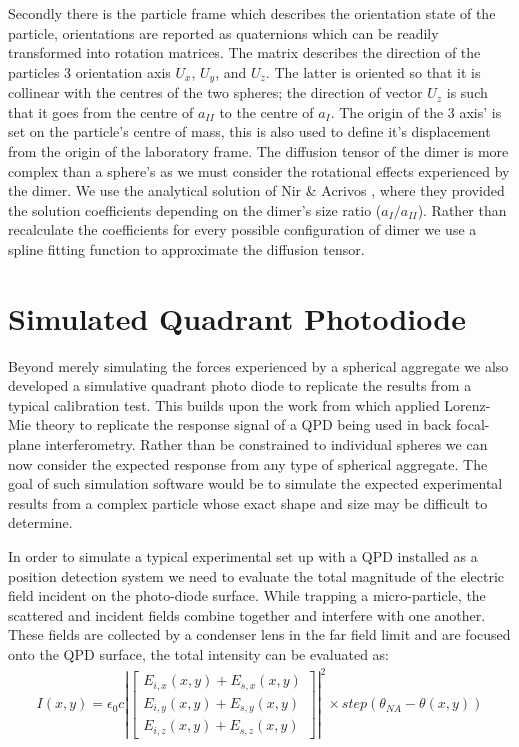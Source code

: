 Secondly there is the particle frame which describes the orientation 
state of the particle, orientations are reported as quaternions which 
can be readily transformed into rotation matrices. The matrix describes 
the direction of the particles 3 orientation axis $U_x$, $U_y$, and 
$U_z$. The latter is oriented so that it is collinear with the centres
of the two spheres; the direction of vector $U_z$ is such that it goes 
from the centre of $a_{II}$ to the centre of $a_{I}$. The origin of the 
3 axis' is set on the particle's centre of mass, this is also used to 
define it's displacement from the origin of the laboratory frame. The 
diffusion tensor of the dimer is more complex than a sphere's as we must consider the rotational effects experienced by the dimer. We use the 
analytical solution of Nir \& Acrivos \cite{Nir1973}, where they provided 
the solution coefficients depending on the dimer's size ratio 
($a_I/a_{II}$). Rather than recalculate the coefficients for every possible configuration of dimer we use a spline fitting function to approximate 
the diffusion tensor. 
\section{Simulated Quadrant Photodiode}
\label{sec:simulated_QPD}

Beyond merely simulating the forces experienced by a spherical 
aggregate we also developed a simulative quadrant photo diode 
to replicate the results from a typical calibration test. This 
builds upon the work from \cite{Rohrbach2002} which applied 
Lorenz-Mie theory to replicate the response signal of a QPD 
being used in back focal-plane interferometry. Rather than be 
constrained to individual spheres we can now consider the 
expected response from any type of spherical aggregate. The
goal of such simulation software would be to simulate the 
expected experimental results from a complex particle whose 
exact shape and size may be difficult to determine. 

In order to simulate a typical experimental set up with a QPD 
installed as a position detection system we need to evaluate 
the total magnitude of the electric field incident on the 
photo-diode surface. While trapping a micro-particle, the 
scattered and incident fields combine together and interfere 
with one another. These fields are collected by a condenser 
lens in the far field limit and are focused onto the QPD 
surface, the total intensity can be evaluated as:
\begin{align}
I(x,y) = \epsilon_0c\left|
\begin{bmatrix} 
	E_{i,x}(x,y)+E_{s,x}(x,y) \\ 
	E_{i,y}(x,y)+E_{s,y}(x,y) \\ 
	E_{i,z}(x,y)+E_{s,z}(x,y)
\end{bmatrix} \right|^2 \times step(\theta_{NA}-\theta(x,y))
\end{align}


